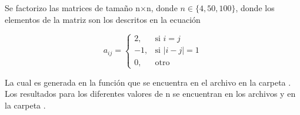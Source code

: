 Se factorizo las matrices de tamaño n$\times$n, donde $n\in \{ 4,50,100\}$, donde los elementos de la matriz son los descritos en la ecuación

\begin{equation}
    a_{ij} = \begin{cases}
        2,  & \text{si } i=j     \\
        -1, & \text{si } |i-j|=1 \\
        0,  & \text{otro}
    \end{cases}
\end{equation}

La cual es generada en la función  que se encuentra en el archivo  en la carpeta . Los resultados para los diferentes valores de n se encuentran en los archivos  y  en la carpeta .